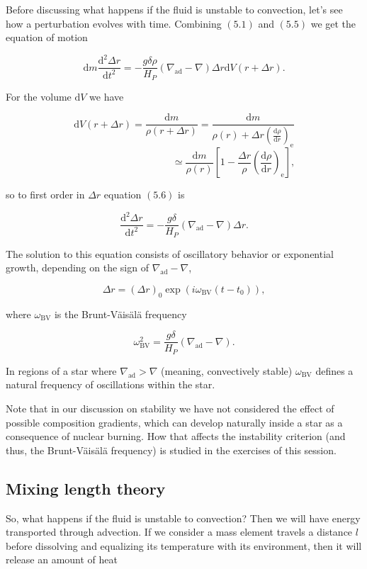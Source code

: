 \documentclass[twocolumn]{article}
\begin{document}
Before discussing what happens if the fluid is unstable to convection,
let's see how a perturbation evolves with time. Combining \((5.1)\) and
\((5.5)\) we get the equation of motion

\[\mathrm{d}m\frac{\mathrm{d}^2\Delta r}{\mathrm{d}t^2}=-\frac{g\delta\rho}{H_P}(\nabla_\mathrm{ad}-\nabla)\Delta r \mathrm{d}V(r+\Delta r)\tag{5.6}.\]

For the volume \(\mathrm{d}V\) we have

\[\mathrm{d}V(r+\Delta r)=\frac{\mathrm{d}m}{\rho(r+\Delta r)}=\frac{\mathrm{d}m}{\displaystyle\rho(r)+\Delta r\left(\frac{\mathrm{d}\rho}{\mathrm{d}r}\right)_\mathrm{e}}\]
\[\qquad\qquad\qquad\qquad\qquad\simeq \frac{\mathrm{d}m}{\rho(r)}\left[1-\frac{\Delta r}{\rho}\left(\frac{\mathrm{d}\rho}{\mathrm{d}r}\right)_\mathrm{e}\right],\]

so to first order in \(\Delta r\) equation \((5.6)\) is

\[\frac{\mathrm{d}^2\Delta r}{\mathrm{d}t^2}=-\frac{g\delta}{H_P}(\nabla_\mathrm{ad}-\nabla)\Delta r.\tag{5.7}\]

The solution to this equation consists of oscillatory behavior or
exponential growth, depending on the sign of
\(\nabla_\mathrm{ad}-\nabla\),

\[\Delta r = (\Delta r)_0 \exp(i\omega_\mathrm{BV}(t-t_0)),\]

where \(\omega_\mathrm{BV}\) is the Brunt-Väisälä frequency

\[\omega_\mathrm{BV}^2 = \frac{g\delta}{H_P}\left(\nabla_\mathrm{ad}-\nabla\right).\]

In regions of a star where \(\nabla_\mathrm{ad}>\nabla\) (meaning,
convectively stable) \(\omega_\mathrm{BV}\) defines a natural frequency
of oscillations within the star.

Note that in our discussion on stability we have not considered the
effect of possible composition gradients, which can develop naturally
inside a star as a consequence of nuclear burning. How that affects the
instability criterion (and thus, the Brunt-Väisälä frequency) is studied
in the exercises of this session.

\hypertarget{mixing-length-theory}{%
\subsection{Mixing length theory}\label{mixing-length-theory}}

So, what happens if the fluid is unstable to convection? Then we will
have energy transported through advection. If we consider a mass element
travels a distance \(l\) before dissolving and equalizing its
temperature with its environment, then it will release an amount of heat
\end{document}
